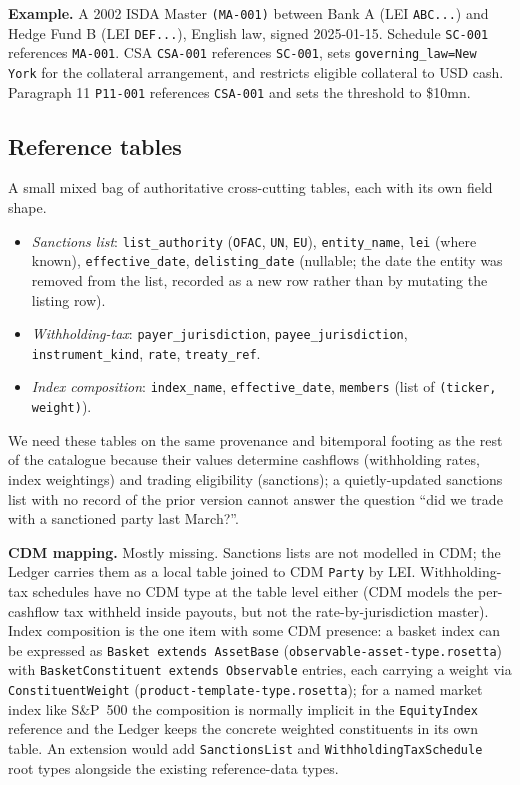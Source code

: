\documentclass[11pt,a4paper]{article}
\begin{document}
\textbf{Example.} A 2002 ISDA Master \texttt{(MA-001)} between Bank A (LEI \texttt{ABC...}) and Hedge Fund B (LEI \texttt{DEF...}), English law, signed 2025-01-15. Schedule \texttt{SC-001} references \texttt{MA-001}. CSA \texttt{CSA-001} references \texttt{SC-001}, sets \texttt{governing\_law=New York} for the collateral arrangement, and restricts eligible collateral to USD cash. Paragraph 11 \texttt{P11-001} references \texttt{CSA-001} and sets the threshold to \$10mn.

\subsection{Reference tables}

A small mixed bag of authoritative cross-cutting tables, each with its own field shape.
\begin{itemize}
\item \emph{Sanctions list}: \texttt{list\_authority} (\texttt{OFAC}, \texttt{UN}, \texttt{EU}), \texttt{entity\_name}, \texttt{lei} (where known), \texttt{effective\_date}, \texttt{delisting\_date} (nullable; the date the entity was removed from the list, recorded as a new row rather than by mutating the listing row).
\item \emph{Withholding-tax}: \texttt{payer\_jurisdiction}, \texttt{payee\_jurisdiction}, \texttt{instrument\_kind}, \texttt{rate}, \texttt{treaty\_ref}.
\item \emph{Index composition}: \texttt{index\_name}, \texttt{effective\_date}, \texttt{members} (list of \texttt{(ticker, weight)}).
\end{itemize}
We need these tables on the same provenance and bitemporal footing as the rest of the catalogue because their values determine cashflows (withholding rates, index weightings) and trading eligibility (sanctions); a quietly-updated sanctions list with no record of the prior version cannot answer the question ``did we trade with a sanctioned party last March?''.

\textbf{CDM mapping.} Mostly missing. Sanctions lists are not modelled in CDM; the Ledger carries them as a local table joined to CDM \texttt{Party} by LEI. Withholding-tax schedules have no CDM type at the table level either (CDM models the per-cashflow tax withheld inside payouts, but not the rate-by-jurisdiction master). Index composition is the one item with some CDM presence: a basket index can be expressed as \texttt{Basket extends AssetBase} (\texttt{observable-asset-type.rosetta}) with \texttt{BasketConstituent extends Observable} entries, each carrying a weight via \texttt{ConstituentWeight} (\texttt{product-template-type.rosetta}); for a named market index like S\&P~500 the composition is normally implicit in the \texttt{EquityIndex} reference and the Ledger keeps the concrete weighted constituents in its own table. An extension would add \texttt{SanctionsList} and \texttt{WithholdingTaxSchedule} root types alongside the existing reference-data types.
\end{document}
